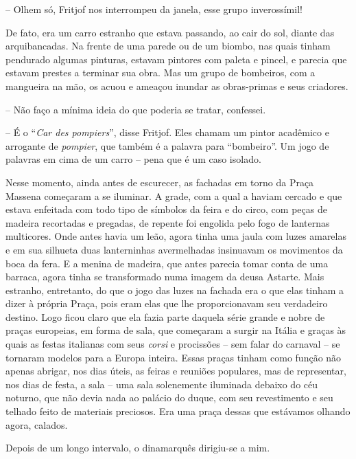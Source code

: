 -- Olhem só, Fritjof nos interrompeu da janela, esse grupo inverossímil!

De fato, era um carro estranho que estava passando, ao cair do sol,
diante das arquibancadas. Na frente de uma parede ou de um biombo, nas
quais tinham pendurado algumas pinturas, estavam pintores com paleta e
pincel, e parecia que estavam prestes a terminar sua obra. Mas um grupo
de bombeiros, com a mangueira na mão, os acuou e ameaçou inundar as
obras-primas e seus criadores.

-- Não faço a mínima ideia do que poderia se tratar, confessei.

-- É o ``\emph{Car des pompiers}'', disse Fritjof. Eles chamam um pintor
acadêmico e arrogante de \emph{pompier}, que também é a palavra para
``bombeiro''. Um jogo de palavras em cima de um carro -- pena que é um
caso isolado.

Nesse momento, ainda antes de escurecer, as fachadas em torno da Praça
Massena começaram a se iluminar. A grade, com a qual a haviam cercado e
que estava enfeitada com todo tipo de símbolos da feira e do circo, com
peças de madeira recortadas e pregadas, de repente foi engolida pelo
fogo de lanternas multicores. Onde antes havia um leão, agora tinha uma
jaula com luzes amarelas e em sua silhueta duas lanterninhas
avermelhadas insinuavam os movimentos da boca da fera. E a menina de
madeira, que antes parecia tomar conta de uma barraca, agora tinha se
transformado numa imagem da deusa Astarte. Mais estranho, entretanto, do
que o jogo das luzes na fachada era o que elas tinham a dizer à própria
Praça, pois eram elas que lhe proporcionavam seu verdadeiro destino.
Logo ficou claro que ela fazia parte daquela série grande e nobre de
praças europeias, em forma de sala, que começaram a surgir na Itália e
graças às quais as festas italianas com seus \emph{corsi} e procissões
-- sem falar do carnaval -- se tornaram modelos para a Europa inteira.
Essas praças tinham como função não apenas abrigar, nos dias úteis, as
feiras e reuniões populares, mas de representar, nos dias de festa, a
sala -- uma sala solenemente iluminada debaixo do céu noturno, que não
devia nada ao palácio do duque, com seu revestimento e seu telhado feito
de materiais preciosos. Era uma praça dessas que estávamos olhando
agora, calados.

Depois de um longo intervalo, o dinamarquês dirigiu-se a mim.

